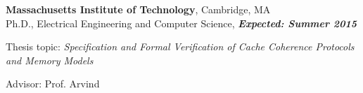 \documentclass[margin,line]{resume}
\begin{document}
\begin{resume}
    \textbf{Massachusetts Institute of Technology}, Cambridge, MA \\
    \vspace{-2mm}
    Ph.D., Electrical Engineering and Computer Science, \hfill \textbf{\textit{Expected: Summer 2015}}\\
    \vspace{-2mm}
    \begin{list2}
        \item Thesis topic: \textit{Specification and Formal Verification of Cache Coherence Protocols and Memory Models}
        \item Advisor:  Prof. Arvind


\end{list2}
\end{resume}
\end{document}
